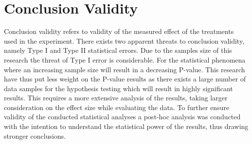 \section{Conclusion Validity}
Conclusion validity refers to validity of the measured effect of the treatments used in the experiment. There exists two apparent threats to conclusion validity, namely Type I and Type II statistical errors. Due to the samples size of this research the threat of Type I error is considerable. For the statistical phenomena where an increasing sample size will result in a decreasing P-value. This research have thus put less weight on the P-value results as there exists a large number of data samples for the hypothesis testing \cite{kampenes2007systematic} which will result in highly significant results. This requires a more extensive analysis of the results, taking larger consideration on the effect size while evaluating the data. To further ensure validity of the conducted statistical analyses a post-hoc analysis was conducted with the intention to understand the statistical power of the results, thus drawing stronger conclusions.\\










